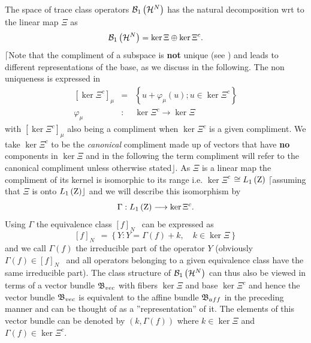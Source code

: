 The space of trace class operators ${\cal B}_{1}\left( {\cal H}^{N}\right) $
has the natural decomposition wrt to the linear map $\Xi $ as 
\begin{equation}
{\cal B}_{1}\left( {\cal H}^{N}\right) =\ker \Xi \oplus \ker \Xi ^{c}.
\end{equation}%
$\lceil $Note that the compliment of a subspace is {\bf not }unique (see %
\cite{Geroch}) and leads to different representations of the base, as we
discuss in the following. The non uniqueness is expressed in 
\begin{eqnarray}
\left[ \ker \Xi ^{c}\right] _{\mu } &=&\left\{ u+\varphi _{\mu }\left(
u\right) ;u\in \ker \Xi ^{c}\right\}  \nonumber \\
\varphi _{\mu } &:&\ker \Xi ^{c}\longrightarrow \ker \Xi
\end{eqnarray}%
with $\left[ \ker \Xi ^{c}\right] _{\mu }$ also being a compliment when $%
\ker \Xi ^{c}$ is a given compliment. We take $\ker \Xi ^{c}$ to be the {\em %
canonical }compliment made up of vectors that have {\bf no }components in $%
\ker \Xi $ and in the following the term compliment will refer to the
canonical compliment unless otherwise stated$\rfloor $. As $\Xi $ is a
linear map the compliment of its kernel is isomorphic to its range i.e. $%
\ker \Xi ^{c}$ $\cong L_{1}\left( {\rm Z}\right) $ $\lceil $assuming that $%
\Xi $ is onto $L_{1}\left( {\rm Z}\right) \rfloor $ and we will describe
this isomorphism by 
\begin{equation}
\Gamma :L_{1}\left( {\rm Z}\right) \longrightarrow \ker \Xi ^{c}.
\end{equation}%
Using $\Gamma $ the equivalence class $\left[ f\right] _{N\text{ }}$ can be
expressed as 
\begin{equation}
\left[ f\right] _{N\text{ }}=\left\{ Y:Y=\Gamma \left( f\right) +k,\quad
k\in \ker \Xi \right\}
\end{equation}%
and we call $\Gamma \left( f\right) $ the irreducible part of the operator $%
Y $ (obviously $\Gamma \left( f\right) \in \left[ f\right] _{N\text{ }}$ and
all operators belonging to a given equivalence class have the same
irreducible part). The class structure of ${\cal B}_{1}\left( {\cal H}%
^{N}\right) $ can thus also be viewed in terms of a vector bundle ${\frak B}%
_{vec}$ with fibers $\ker \Xi $ and base $\ker \Xi ^{c}$ and hence the
vector bundle ${\frak B}_{vec}$ is equivalent to the affine bundle ${\frak B}%
_{aff}$ in the preceding manner and can be thought of as a
''representation'' of it. The elements of this vector bundle can be denoted
by $\left( k,\Gamma \left( f\right) \right) $ where $k\in \ker \Xi $ and $%
\Gamma \left( f\right) \in \ker \Xi ^{c}$.

